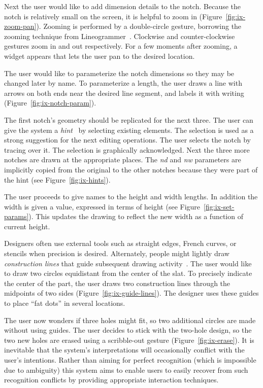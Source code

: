 \documentclass[12pt]{article}
\begin{document}
Next the user would like to add dimension details to the
notch. Because the notch is relatively small on the screen, it is
helpful to zoom in (Figure~\ref{fig:ix-zoom-pan}). Zooming is
performed by a double-circle gesture, borrowing the zooming
technique from Lineogrammer~\cite{zeleznik-lineogrammer}. Clockwise
and counter-clockwise gestures zoom in and out respectively. For a few
moments after zooming, a widget appears that lets the user pan to the
desired location.

The user would like to parameterize the notch dimensions so they may be
changed later by name. To parameterize a length, the user draws a line
with arrows on both ends near the desired line segment, and labels it
with writing (Figure~\ref{fig:ix-notch-param}).

The first notch's geometry should be replicated for the next
three. The user can give the system a
\textit{hint}~\cite{mcdaniel-gamut} by selecting existing
elements. The selection is used as a strong suggestion for the next
editing operations. The user selects the notch by tracing over it. The
selection is graphically acknowledged. Next the three more notches are
drawn at the appropriate places. The \textit{nd} and \textit{nw}
parameters are implicitly copied from the original to the other
notches because they were part of the hint (see
Figure~\ref{fig:ix-hints}).

The user proceeds to give names to the height and width lengths. In
addition the width is given a value, expressed in terms of height (see
Figure~\ref{fig:ix-set-params}). This updates the drawing to reflect
the new width as a function of current height.

Designers often use external tools such as straight edges, French
curves, or stencils when precision is desired. Alternately, people
might lightly draw \textit{construction lines} that guide subsequent
drawing activity~\cite{company-sketching-in-engineering}. The user
would like to draw two circles equidistant from the center of the
slat. To precisely indicate the center of the part, the user draws two
construction lines through the midpoints of two sides
(Figure~\ref{fig:ix-guide-lines}). The designer uses these guides
to place ``fat dots'' in several locations.

The user now wonders if three holes might fit, so two additional
circles are made without using guides. The user decides to stick with
the two-hole design, so the two new holes are erased using a
scribble-out gesture (Figure~\ref{fig:ix-erase}). It is inevitable
that the system's interpretations will occasionally conflict with the
user's intentions. Rather than aiming for perfect recognition (which
is impossible due to ambiguity) this system aims to enable users to
easily recover from such recognition conflicts by providing
appropriate interaction techniques.
\end{document}
